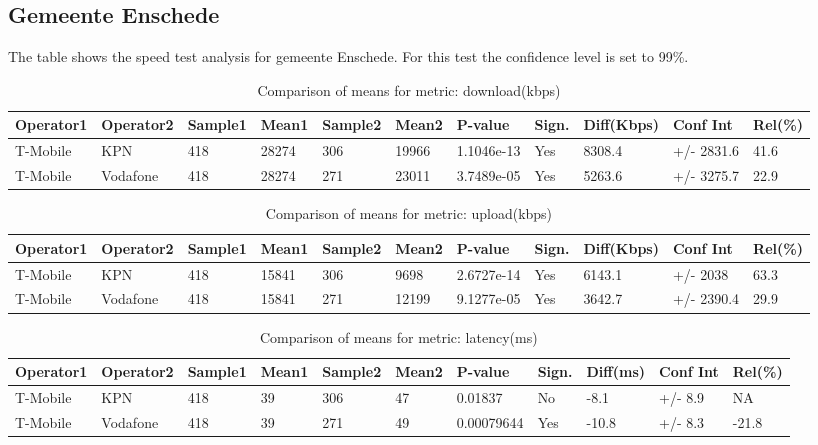 \documentclass[]{article}
\begin{document}
\normalsize

\newpage

\subsection{Gemeente Enschede}\label{gemeente-enschede}

The table shows the speed test analysis for gemeente Enschede. For this
test the confidence level is set to 99\%.

\begin{table}[ht]
\centering
{\footnotesize
\begin{tabular}{lllllllllll}
  \hline
Operator1 & Operator2 & Sample1 & Mean1 & Sample2 & Mean2 & P-value & Sign. & Diff(Kbps) & Conf Int & Rel(\%) \\ 
  \hline
T-Mobile & KPN & 418 & 28274 & 306 & 19966 & 1.1046e-13 & Yes & 8308.4 & +/- 2831.6 & 41.6 \\ 
  T-Mobile & Vodafone & 418 & 28274 & 271 & 23011 & 3.7489e-05 & Yes & 5263.6 & +/- 3275.7 & 22.9 \\ 
   \hline
\end{tabular}
}
\caption{Comparison of means for metric: download(kbps)} 
\end{table}

\begin{table}[ht]
\centering
{\footnotesize
\begin{tabular}{lllllllllll}
  \hline
Operator1 & Operator2 & Sample1 & Mean1 & Sample2 & Mean2 & P-value & Sign. & Diff(Kbps) & Conf Int & Rel(\%) \\ 
  \hline
T-Mobile & KPN & 418 & 15841 & 306 & 9698 & 2.6727e-14 & Yes & 6143.1 & +/- 2038 & 63.3 \\ 
  T-Mobile & Vodafone & 418 & 15841 & 271 & 12199 & 9.1277e-05 & Yes & 3642.7 & +/- 2390.4 & 29.9 \\ 
   \hline
\end{tabular}
}
\caption{Comparison of means for metric: upload(kbps)} 
\end{table}

\begin{table}[ht]
\centering
{\footnotesize
\begin{tabular}{lllllllllll}
  \hline
Operator1 & Operator2 & Sample1 & Mean1 & Sample2 & Mean2 & P-value & Sign. & Diff(ms) & Conf Int & Rel(\%) \\ 
  \hline
T-Mobile & KPN & 418 & 39 & 306 & 47 & 0.01837 & No & -8.1 & +/- 8.9 & NA \\ 
  T-Mobile & Vodafone & 418 & 39 & 271 & 49 & 0.00079644 & Yes & -10.8 & +/- 8.3 & -21.8 \\ 
   \hline
\end{tabular}
}
\caption{Comparison of means for metric: latency(ms)} 
\end{table}
\end{document}
